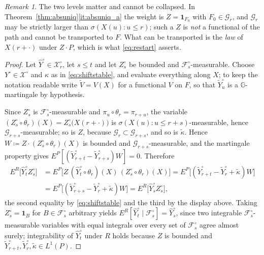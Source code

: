 \documentclass[11pt,a4paper]{article}
\theoremstyle{plain}
\theoremstyle{definition}
\theoremstyle{remark}
\newtheorem{remark}[theorem]{Remark}
\newcommand{\Filt}{\mathcal{F}}
\newcommand{\Gilt}{\mathcal{G}}
\newcommand{\XX}{\mathcal{X}}                  %
\newcommand{\one}{\mathbf{1}}
\begin{document}
\begin{remark}
  \label{rem:restarttwolevel}
  The two levels matter and cannot be collapsed.  In
  Theorem~\ref{thm:absuniq}\ref{it:absuniq_a} the weight is $Z = \one_{F_0}$ with
  $F_0 \in \Gilt_r$, and $\Gilt_r$ may be strictly larger than
  $\sigma(X(u) : u \leq r)$; such a $Z$ is \emph{not} a functional of the path and
  cannot be transported to $F$.  What can be transported is the \emph{law} of
  $X(r+\cdot)$ under $Z \cdot P$, which is what \eqref{eq:restart} asserts.
\end{remark}


\begin{proof}
  Let $\hat{Y}^\circ \in \XX^\circ_r$, let $s \leq t$ and let $Z^\circ_s$ be
  bounded and $\Filt^\circ_s$-measurable.  Choose $Y^\circ \in \XX^\circ$ and $\kappa$ as in
  \eqref{eq:shiftstable}, and evaluate everything along $X$; to keep the notation
  readable write $\tilde{V} = V(X)$ for a functional $V$ on $F$, so that
  $\tilde{Y}^\circ_u$ is a $\mathbb{G}$-martingale by hypothesis.

  Since $Z^\circ_s$ is $\Filt^\circ_s$-measurable and
  $\pi_u \circ \theta_r = \pi_{r+u}$, the variable
  $(Z^\circ_s \circ \theta_r)(X) = Z^\circ_s\bigl(X(r+\cdot)\bigr)$ is
  $\sigma(X(u) : u \leq r+s)$-measurable, hence $\Gilt_{r+s}$-measurable; so is
  $Z$, because $\Gilt_r \subset \Gilt_{r+s}$, and so is $\tilde{\kappa}$.  Hence
  $W \coloneqq Z \cdot (Z^\circ_s \circ \theta_r)(X)$ is bounded and
  $\Gilt_{r+s}$-measurable, and the martingale property gives
  $E^P[(\tilde{Y}^\circ_{r+t} - \tilde{Y}^\circ_{r+s}) W] = 0$.  Therefore
  \begin{align*}
    E^R\bigl[ \hat{Y}^\circ_t Z^\circ_s \bigr]
      &= E^P\bigl[ Z \, (\hat{Y}^\circ_t \circ \theta_r)(X) \,
                   (Z^\circ_s \circ \theta_r)(X) \bigr]
       = E^P\bigl[ (\tilde{Y}^\circ_{r+t} - \tilde{Y}^\circ_r + \tilde{\kappa}) W \bigr] \\
      &= E^P\bigl[ (\tilde{Y}^\circ_{r+s} - \tilde{Y}^\circ_r + \tilde{\kappa}) W \bigr]
       = E^R\bigl[ \hat{Y}^\circ_s Z^\circ_s \bigr] ,
  \end{align*}
  the second equality by \eqref{eq:shiftstable} and the third by the display
  above.  Taking $Z^\circ_s = \one_{B}$ for $B \in \Filt^\circ_s$ arbitrary
  yields $E^R[\hat{Y}^\circ_t \mid \Filt^\circ_s] = \hat{Y}^\circ_s$, since two
  integrable $\Filt^\circ_s$-measurable variables with equal integrals over every
  set of $\Filt^\circ_s$ agree almost surely; integrability of
  $\hat{Y}^\circ_t$ under $R$ holds because $Z$ is bounded and
  $\tilde{Y}^\circ_{r+t}, \tilde{Y}^\circ_r, \tilde\kappa \in L^1(P)$.
\end{proof}
\end{document}
